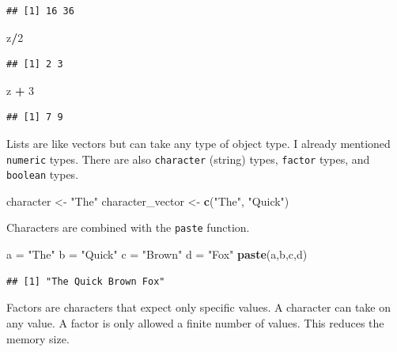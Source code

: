 \documentclass[openany]{book}
\newenvironment{Shaded}{\begin{snugshade}}{\end{snugshade}}
\newcommand{\DecValTok}[1]{\textcolor[rgb]{0.00,0.00,0.81}{#1}}
\newcommand{\KeywordTok}[1]{\textcolor[rgb]{0.13,0.29,0.53}{\textbf{#1}}}
\newcommand{\NormalTok}[1]{#1}
\newcommand{\OperatorTok}[1]{\textcolor[rgb]{0.81,0.36,0.00}{\textbf{#1}}}
\newcommand{\StringTok}[1]{\textcolor[rgb]{0.31,0.60,0.02}{#1}}
\begin{document}
\begin{verbatim}
## [1] 16 36
\end{verbatim}

\begin{Shaded}
\begin{Highlighting}[]
\NormalTok{z}\OperatorTok{/}\DecValTok{2}
\end{Highlighting}
\end{Shaded}

\begin{verbatim}
## [1] 2 3
\end{verbatim}

\begin{Shaded}
\begin{Highlighting}[]
\NormalTok{z }\OperatorTok{+}\StringTok{ }\DecValTok{3}
\end{Highlighting}
\end{Shaded}

\begin{verbatim}
## [1] 7 9
\end{verbatim}

Lists are like vectors but can take any type of object type. I already mentioned \texttt{numeric} types. There are also \texttt{character} (string) types, \texttt{factor} types, and \texttt{boolean} types.

\begin{Shaded}
\begin{Highlighting}[]
\NormalTok{character <-}\StringTok{ "The"}
\NormalTok{character_vector <-}\StringTok{ }\KeywordTok{c}\NormalTok{(}\StringTok{"The"}\NormalTok{, }\StringTok{"Quick"}\NormalTok{)}
\end{Highlighting}
\end{Shaded}

Characters are combined with the \texttt{paste} function.

\begin{Shaded}
\begin{Highlighting}[]
\NormalTok{a =}\StringTok{ "The"}
\NormalTok{b =}\StringTok{ "Quick"}
\NormalTok{c =}\StringTok{ "Brown"}
\NormalTok{d =}\StringTok{ "Fox"}
\KeywordTok{paste}\NormalTok{(a,b,c,d)}
\end{Highlighting}
\end{Shaded}

\begin{verbatim}
## [1] "The Quick Brown Fox"
\end{verbatim}

Factors are characters that expect only specific values. A character can take on any value. A factor is only allowed a finite number of values. This reduces the memory size.
\end{document}
